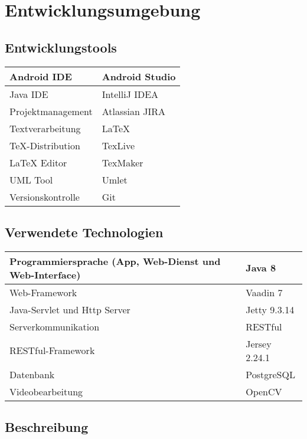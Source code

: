\chapter{Entwicklungsumgebung}

\section{Entwicklungstools}

\begin{flushleft}
\begin{tabularx} {\textwidth}{|X|X|} \hline
\gls{Android} IDE & Android Studio \\ \hline
Java \gls{IDE} & IntelliJ IDEA \\ \hline
Projektmanagement & Atlassian JIRA \\ \hline
Textverarbeitung & LaTeX \\ \hline
TeX-Distribution & TexLive \\ \hline
LaTeX Editor & TexMaker \\ \hline
UML Tool & Umlet \\ \hline
Versionskontrolle & Git \\ \hline
\end{tabularx}
\end{flushleft}

\section{Verwendete Technologien}

\begin{flushleft}
\begin{tabularx} {\textwidth}{|X|X|} \hline
Programmiersprache (\gls{App}, \gls{Web-Dienst} und \gls{Web-Interface}) & Java 8 \\ \hline
Web-Framework & Vaadin 7 \\ \hline
\gls{Java-Servlet} und Http Server & Jetty 9.3.14 \\ \hline
Serverkommunikation & RESTful \\ \hline
RESTful-Framework & Jersey 2.24.1 \\ \hline
Datenbank & PostgreSQL \\ \hline
Videobearbeitung & OpenCV \\ \hline
\end{tabularx}
\end{flushleft}

\section{Beschreibung}

